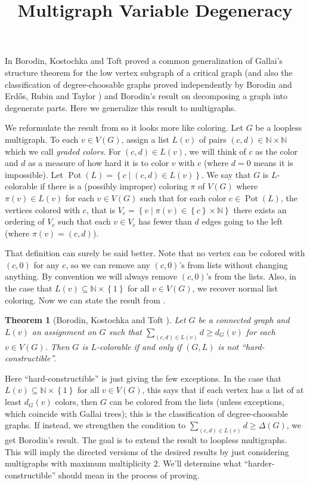 \documentclass[12pt]{amsart}
\title{Multigraph Variable Degeneracy}
\author{}
\theoremstyle{plain}
\newtheorem{thm}{Theorem}
\theoremstyle{definition}
\theoremstyle{remark}
\newcommand{\IN}{\mathbb{N}}
\newcommand{\set}[1]{\left\{ #1 \right\}}
\newcommand{\setbs}[2]{\left\{ #1 \mid #2 \right\}}
\newcommand{\pot}{\operatorname{Pot}}
\begin{document}
\maketitle

In \cite{borodin2000variable} Borodin, Kostochka and Toft proved a common generalization of Gallai's structure theorem for the low vertex subgraph of a critical graph (and also the classification of degree-choosable graphs proved independently by Borodin \cite{borodin1977criterion} and Erd\H{o}s, Rubin and Taylor \cite{ErdosRT79}) and Borodin's \cite{borodin1976decomposition} result on decomposing a graph into degenerate parts.  Here we generalize this result to multigraphs.

We reformulate the result from \cite{borodin2000variable} so it looks more like coloring.  Let $G$ be a loopless multigraph.  To each $v \in V(G)$, assign a list $L(v)$ of pairs $(c,d) \in \IN \times \IN$ which we call \emph{graded colors}.  For $(c,d) \in L(v)$, we will think of $c$ as the color and $d$ as a measure of how hard it is to color $v$ with $c$ (where $d = 0$ means it is impossible). Let $\pot(L) = \setbs{c}{(c,d) \in L(v)}$. We say that $G$ is $L$-colorable if there is a (possibly improper) coloring $\pi$ of $V(G)$ where $\pi(v) \in L(v)$ for each $v \in V(G)$ such that for each color $c \in \pot(L)$, the vertices colored with $c$, that is $V_c = \setbs{v}{\pi(v) \in \set{c} \times \IN}$ there exists an ordering of $V_c$ such that each $v \in V_c$ has fewer than $d$ edges going to the left (where $\pi(v) = (c,d)$).

That definition can surely be said better.  Note that no vertex can be colored with $(c,0)$ for any $c$, so we can remove any $(c,0)$'s from lists without changing anything.  By convention we will always remove $(c,0)$'s from the lists.  Also, in the case that $L(v) \subseteq \IN \times \set{1}$ for all $v \in V(G)$, we recover normal list coloring.  Now we can state the result from \cite{borodin2000variable}.

\begin{thm}[Borodin, Kostochka and Toft \cite{borodin2000variable}]
Let $G$ be a connected graph and $L(v)$ an assignment on $G$ such that $\sum_{(c,d) \in L(v)} d \ge d_G(v)$ for each $v \in V(G)$.  Then $G$ is $L$-colorable if and only if $(G,L)$ is not ``hard-constructible''.
\end{thm}

Here ``hard-constructible'' is just giving the few exceptions.  In the case that $L(v) \subseteq \IN \times \set{1}$ for all $v \in V(G)$, this says that if each vertex has a list of at least $d_G(v)$ colors, then $G$ can be colored from the lists (unless exceptions, which coincide with Gallai trees); this is the classification of degree-choosable graphs.  If instead, we strengthen the condition to $\sum_{(c,d) \in L(v)} d \ge \Delta(G)$, we get Borodin's \cite{borodin1976decomposition} result.  The goal is to extend the result to loopless multigraphs. This will imply the directed versions of the desired results by just considering multigraphs with maximum multiplicity $2$.  We'll determine what ``harder-constructible'' should mean in the process of proving.
\end{document}
